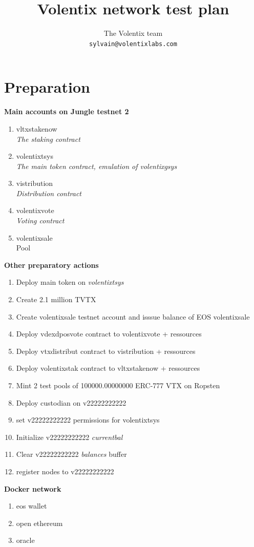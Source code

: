 \documentclass[]{article}
\title{Volentix network test plan}
\author{
		The Volentix team\\
	\texttt{sylvain@volentixlabs.com}
}
\begin{document}
\maketitle


\section{Preparation}

\textbf{Main accounts on Jungle testnet 2}
	
  \begin{enumerate}
  \item  vltxstakenow\\
\textit{  The staking contract}
  \item volentixtsys \\
  \textit{  The main token contract, emulation of volentixgsys}
  \item vistribution\\
  \textit{Distribution contract}
  \item volentixvote \\
  \textit{  Voting contract}
    \item volentixsale \\
		Pool
  
\end{enumerate}
 \textbf{Other preparatory actions}
  		\begin{enumerate}
  		  \item Deploy main token on \textit{volentixtsys}
  		  \item Create 2.1 million TVTX
  		  \item Create volentixsale testnet account and isssue balance of EOS volentixsale
  		  \item Deploy vdexdposvote contract to volentixvote + ressources
  		  \item Deploy vtxdistribut contract to vistribution + ressources
  		  \item Deploy volentixstak  contract to vltxstakenow + ressources
 		  \item Mint 2 test pools of 100000.00000000 ERC-777 VTX on Ropsten 
		  \item Deploy custodian on v22222222222 
		  \item set v22222222222 permissions for volentixtsys
		  \item Initialize v22222222222 \textit{currentbal}
		  \item Clear v22222222222 \textit{balances} buffer
		    \item register nodes to v22222222222\\
	 \end{enumerate}
   \textbf{Docker network}\\
  \begin{enumerate}
  	\item eos wallet
  	\item open ethereum
  	\item oracle
  \end{enumerate}
\end{document}
